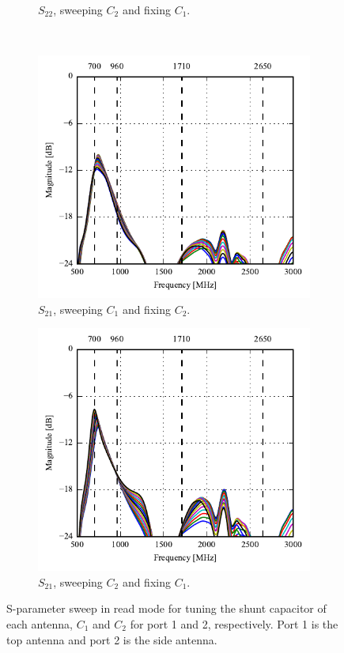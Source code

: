 \begin{figure}[htbp]
\begin{subfigure}[b]{0.49\linewidth}
        \caption{$S_{22}$, sweeping $C_2$ and fixing $C_1$.}
    \end{subfigure}
~
    \begin{subfigure}[b]{0.49\linewidth}
        \centering
        \includegraphics{img/tech_sol/monopole/read_mode/s21_s11}
        \caption{$S_{21}$, sweeping $C_1$ and fixing $C_2$.}
    \end{subfigure}
    \hfill
    \begin{subfigure}[b]{0.49\linewidth}
        \centering
        \includegraphics{img/tech_sol/monopole/read_mode/s21_s22}
        \caption{$S_{21}$, sweeping $C_2$ and fixing $C_1$.}
    \end{subfigure}
    \caption{S-parameter sweep in read mode for tuning the shunt capacitor of each antenna, $C_1$ and $C_2$ for port 1 and 2, respectively. Port 1 is the top antenna and port 2 is the side antenna.}
    \label{fig:sparam_mono_read_mode}
\end{figure}

